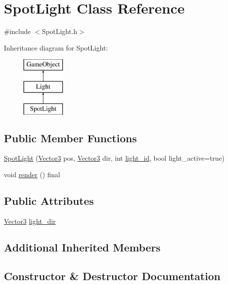 \hypertarget{class_spot_light}{}\section{Spot\+Light Class Reference}
\label{class_spot_light}


{\ttfamily \#include $<$Spot\+Light.\+h$>$}

Inheritance diagram for Spot\+Light\+:\begin{figure}[H]
\begin{center}
\leavevmode
\includegraphics[height=3.000000cm]{class_spot_light}
\end{center}
\end{figure}
\subsection*{Public Member Functions}
\begin{DoxyCompactItemize}
\item 
\hyperlink{class_spot_light_a2e1f999d7325c5d6d5cc0d5f4c58e447}{Spot\+Light} (\hyperlink{class_vector3}{Vector3} pos, \hyperlink{class_vector3}{Vector3} dir, int \hyperlink{class_light_ae0028340ad3a9f2e196b68365d5fe972}{light\+\_\+id}, bool light\+\_\+active=true)
\item 
void \hyperlink{class_spot_light_a05dc942328210344caff20ffd58d0eb6}{render} () final
\end{DoxyCompactItemize}
\subsection*{Public Attributes}
\begin{DoxyCompactItemize}
\item 
\hyperlink{class_vector3}{Vector3} \hyperlink{class_spot_light_a105b6a5c34c8ee65a822a84090c26ba1}{light\+\_\+dir}
\end{DoxyCompactItemize}
\subsection*{Additional Inherited Members}


\subsection{Constructor \& Destructor Documentation}
\mbox{\label{class_spot_light_a2e1f999d7325c5d6d5cc0d5f4c58e447}} 
